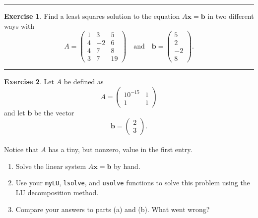 \documentclass[
]{book}
\providecommand{\tightlist}{%
  \setlength{\itemsep}{0pt}\setlength{\parskip}{0pt}}
\theoremstyle{definition}
\theoremstyle{definition}
\theoremstyle{definition}
\newtheorem{exercise}{Exercise}[chapter]
\theoremstyle{remark}
\begin{document}
\begin{center}\rule{0.5\linewidth}{0.5pt}\end{center}

\begin{exercise}
\protect\hypertarget{exr:unnamed-chunk-389}{}{\label{exr:unnamed-chunk-389} }Find a least squares solution to the equation \(A \boldsymbol{x} = \boldsymbol{b}\) in two
different ways with
\[A = \begin{pmatrix} 1 & 3 & 5 \\ 4 & -2 & 6 \\ 4 & 7 & 8 \\ 3 & 7 & 19
        \end{pmatrix} \quad \text{and} \quad \boldsymbol{b} = \begin{pmatrix} 5 \\ 2 \\ -2 \\
        8\end{pmatrix}.\]
\end{exercise}

\begin{center}\rule{0.5\linewidth}{0.5pt}\end{center}

\begin{exercise}
\protect\hypertarget{exr:unnamed-chunk-390}{}{\label{exr:unnamed-chunk-390} }Let \(A\) be defined as
\[ A = \begin{pmatrix} 10^{-15} & 1 \\ 1 & 1 \end{pmatrix} \]
and let \(\boldsymbol{b}\) be the vector
\[ \boldsymbol{b}=\begin{pmatrix} 2 \\ 3\end{pmatrix}. \]\\
Notice that \(A\) has a tiny, but nonzero, value in the first entry.

\begin{enumerate}
\def\labelenumi{\alph{enumi}.}
\tightlist
\item
  Solve the linear system \(A \boldsymbol{x}=\boldsymbol{b}\) by hand.\\
\item
  Use your \texttt{myLU}, \texttt{lsolve}, and \texttt{usolve} functions to solve this problem using the LU decomposition method.\\
\item
  Compare your answers to parts (a) and (b). What went wrong?
\end{enumerate}
\end{exercise}
\end{document}
